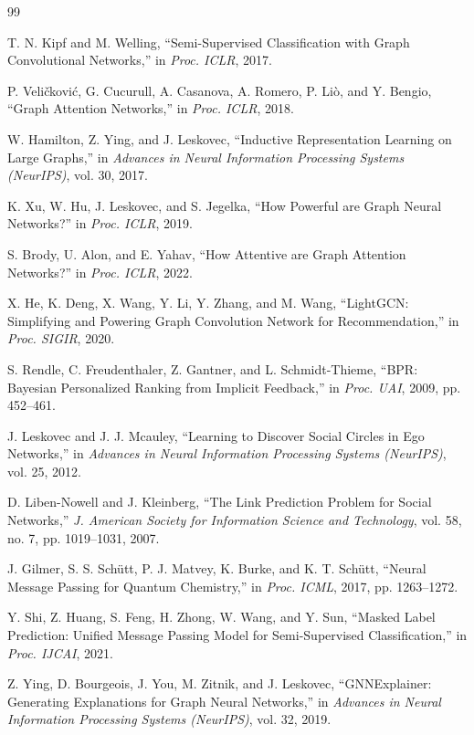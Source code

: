 \documentclass[12pt,a4paper]{article}
\begin{document}
\newpage
\begin{thebibliography}{99}

T. N. Kipf and M. Welling,
``Semi-Supervised Classification with Graph Convolutional Networks,''
in \textit{Proc. ICLR}, 2017.

P. Veli{\v{c}}kovi{\'c}, G. Cucurull, A. Casanova, A. Romero, P. Li{\`o}, and Y. Bengio,
``Graph Attention Networks,''
in \textit{Proc. ICLR}, 2018.

W. Hamilton, Z. Ying, and J. Leskovec,
``Inductive Representation Learning on Large Graphs,''
in \textit{Advances in Neural Information Processing Systems (NeurIPS)}, vol. 30, 2017.

K. Xu, W. Hu, J. Leskovec, and S. Jegelka,
``How Powerful are Graph Neural Networks?''
in \textit{Proc. ICLR}, 2019.

S. Brody, U. Alon, and E. Yahav,
``How Attentive are Graph Attention Networks?''
in \textit{Proc. ICLR}, 2022.

X. He, K. Deng, X. Wang, Y. Li, Y. Zhang, and M. Wang,
``LightGCN: Simplifying and Powering Graph Convolution Network for Recommendation,''
in \textit{Proc. SIGIR}, 2020.

S. Rendle, C. Freudenthaler, Z. Gantner, and L. Schmidt-Thieme,
``BPR: Bayesian Personalized Ranking from Implicit Feedback,''
in \textit{Proc. UAI}, 2009, pp. 452--461.

J. Leskovec and J. J. Mcauley,
``Learning to Discover Social Circles in Ego Networks,''
in \textit{Advances in Neural Information Processing Systems (NeurIPS)}, vol. 25, 2012.

D. Liben-Nowell and J. Kleinberg,
``The Link Prediction Problem for Social Networks,''
\textit{J. American Society for Information Science and Technology}, vol. 58, no. 7, pp. 1019--1031, 2007.

J. Gilmer, S. S. Schütt, P. J. Matvey, K. Burke, and K. T. Schütt,
``Neural Message Passing for Quantum Chemistry,''
in \textit{Proc. ICML}, 2017, pp. 1263--1272.

Y. Shi, Z. Huang, S. Feng, H. Zhong, W. Wang, and Y. Sun,
``Masked Label Prediction: Unified Message Passing Model for Semi-Supervised Classification,''
in \textit{Proc. IJCAI}, 2021.

Z. Ying, D. Bourgeois, J. You, M. Zitnik, and J. Leskovec,
``GNNExplainer: Generating Explanations for Graph Neural Networks,''
in \textit{Advances in Neural Information Processing Systems (NeurIPS)}, vol. 32, 2019.

\end{thebibliography}
\end{document}

